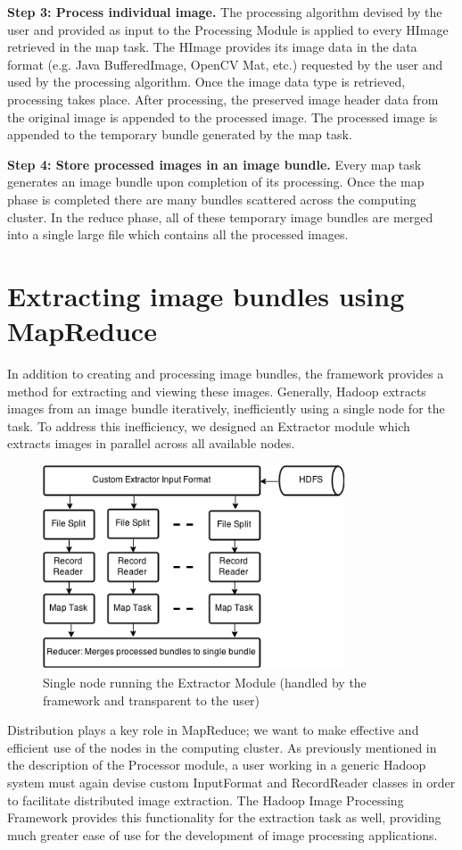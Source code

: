 \documentclass{osuthesis}
\begin{document}
				\textbf{Step 3: Process individual image.}  The processing algorithm
				devised by the user and provided as input to the Processing Module is
				applied to every HImage retrieved in the map task.  The HImage
				provides its image data in the data format (e.g. Java BufferedImage,
				OpenCV Mat, etc.) requested by the user and used by the processing
				algorithm. Once the image data type is retrieved, processing takes
				place. After processing, the preserved image header data from the
				original image is appended to the processed image. The processed image
				is appended to the temporary bundle generated by the map task.
				
				\textbf{Step 4: Store processed images in an image bundle.} Every map
				task generates an image bundle upon completion of its processing.
				Once the map phase is completed there are many bundles scattered
				across the computing cluster.  In the reduce phase, all of these
				temporary image bundles are merged into a single large file which
				contains all the processed images.
				
				
				\section{Extracting image bundles using MapReduce}
				In addition to creating and processing image bundles, the framework
				provides a method for extracting and viewing these images.  Generally,
				Hadoop extracts images from an image bundle iteratively, inefficiently
				using a single node for the task. To address this inefficiency, we
				designed an Extractor module which extracts images in parallel across
				all available nodes.
				\begin{figure}[h]
					\centering
					\includegraphics[width=0.80\textwidth]{ext-node}
					\caption{Single node running the Extractor Module (handled by the
						framework and transparent to the user)}
					\label{fig:ext-node}
				\end{figure}
				Distribution plays a key role in MapReduce; we want to make effective
				and efficient use of the nodes in the computing cluster.  As
				previously mentioned in the description of the Processor module, a
				user working in a generic Hadoop system must again devise custom
				InputFormat and RecordReader classes in order to facilitate
				distributed image extraction.  The Hadoop Image Processing Framework
				provides this functionality for the extraction task as well, providing
				much greater ease of use for the development of image processing
				applications.
				
\end{document}
